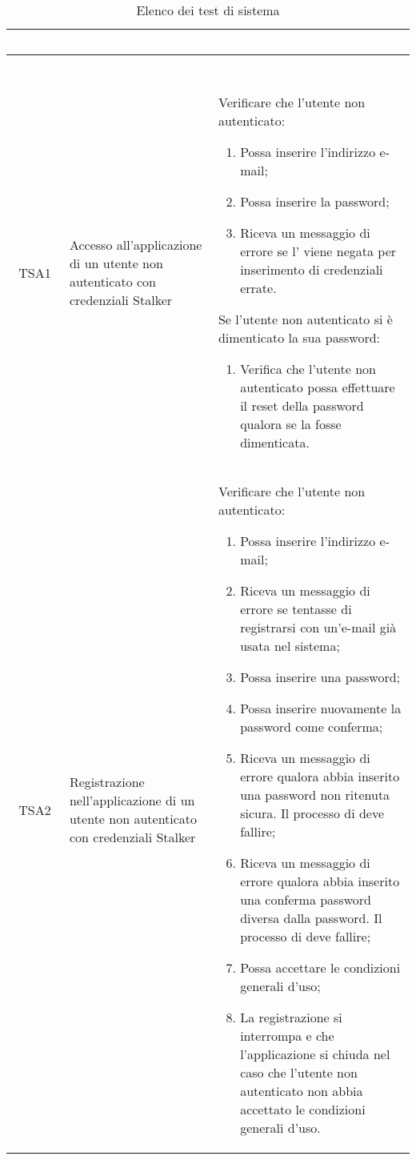 {
\renewcommand{\arraystretch}{1.5}
\centering
\begin{longtable}{ c  C{3cm}  C{11cm} }
\caption{Elenco dei test di sistema}\\
\textcolor{white}{\textbf{Codice}} & \textcolor{white}{\textbf{Titolo}} & \textcolor{white}{\textbf{Descrizione}} \\
\endfirsthead
{}
\textcolor{white}{\textbf{Codice}} & \textcolor{white}{\textbf{Titolo}} & \textcolor{white}{\textbf{Descrizione}} \\
\endhead

TSA1 & Accesso all'applicazione di un utente non autenticato con credenziali Stalker &
Verificare che l'utente non autenticato:
\begin{enumerate}
    \item Possa inserire l'indirizzo e-mail;
    \item Possa inserire la password;
    \item Riceva un messaggio di errore se l' viene negata per inserimento di credenziali errate.
\end{enumerate}
Se l'utente non autenticato si è dimenticato la sua password:
\begin{enumerate}[resume]
    \item Verifica che l'utente non autenticato possa effettuare il reset della password qualora se la fosse dimenticata.
\end{enumerate} \\

TSA2 & Registrazione nell'applicazione di un utente non autenticato con credenziali Stalker &
Verificare che l'utente non autenticato:
\begin{enumerate}
    \item Possa inserire l'indirizzo e-mail;
    \item Riceva un messaggio di errore se tentasse di registrarsi con un'e-mail già usata nel sistema;
    \item Possa inserire una password;
    \item Possa inserire nuovamente la password come conferma;
    \item Riceva un messaggio di errore qualora abbia inserito una password non ritenuta sicura. Il processo di  deve fallire;
    \item Riceva un messaggio di errore qualora abbia inserito una conferma password diversa dalla password. Il processo di  deve fallire;
    \item Possa accettare le condizioni generali d'uso;
    \item La registrazione si interrompa e che l'applicazione si chiuda nel caso che l'utente non autenticato non abbia accettato le condizioni generali d'uso.
\end{enumerate} \\


\end{longtable}}
